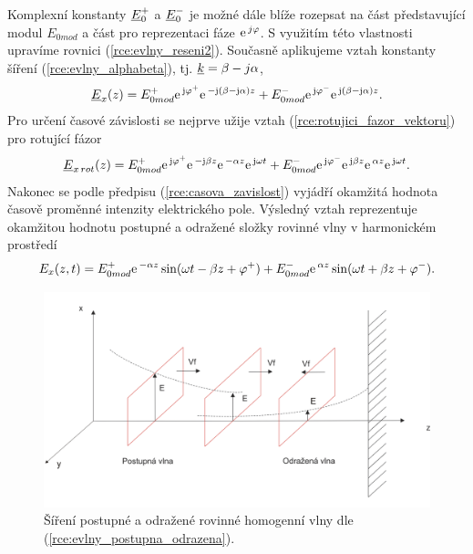 Komplexní konstanty ${\underline{E}}_{0}^{+}$ a ${\underline{E}}_{0}^{-}$ je možné dále blíže rozepsat na část představující modul $E_{0mod}$ a část pro reprezentaci fáze $\mathrm{e\,}^{j\varphi}$. S využitím této vlastnosti upravíme rovnici (\ref{rce:evlny_reseni2}). Současně aplikujeme vztah konstanty šíření (\ref{rce:evlny_alphabeta}), tj. ${\underline{k}} = \beta - j\alpha$,
\begin{displaymath}
	{\underline{E}}_{x}(z) = E_{0mod}^{+}\mathrm{e\,}^{\mathrm{j}\varphi^{+}}\mathrm{e\,}^{-\mathrm{j}(\beta - \mathrm{j}\alpha)z} + E_{0mod}^{-}\mathrm{e\,}^{\mathrm{j}\varphi^{-}}\mathrm{e\,}^{\mathrm{j}(\beta-\mathrm{j}\alpha)z}.
\end{displaymath}
Pro určení časové závislosti se nejprve užije vztah (\ref{rce:rotujici_fazor_vektoru}) pro rotující fázor
\begin{displaymath}
	{\underline{E}}_{x\,rot}(z) = E_{0mod}^{+}\mathrm{e\,}^{\mathrm{j}\varphi^{+}}\mathrm{e\,}^{-\mathrm{j}\beta z}\mathrm{e\,}^{-\alpha z}\mathrm{e\,}^{\mathrm{j}\omega t} + E_{0mod}^{-}\mathrm{e\,}^{\mathrm{j}\varphi^{-}}\mathrm{e\,}^{\mathrm{j}\beta z}\mathrm{e\,}^{\alpha z}\mathrm{e\,}^{\mathrm{j}\omega t}.
\end{displaymath}
Nakonec se podle předpisu (\ref{rce:casova_zavislost}) vyjádří okamžitá hodnota časově proměnné intenzity elektrického pole. Výsledný vztah reprezentuje okamžitou hodnotu postupné a odražené složky rovinné vlny v harmonickém prostředí
\begin{equation}
	E_{x}(z,t) = E_{0mod}^{+}\mathrm{e\,}^{-\alpha z}\sin(\omega t - \beta z + \varphi^{+}) + E_{0mod}^{-}\mathrm{e\,}^{\alpha z}\sin(\omega t + \beta z + \varphi^{-}).
	\label{rce:evlny_postupna_odrazena}
\end{equation}

\begin{figure}[!h]
	\centering
	\includegraphics[width=14cm]{evlny_postupna_odrazena.png}
	\caption{Šíření postupné a odražené rovinné homogenní vlny dle (\ref{rce:evlny_postupna_odrazena}).}
	\label{obr:evlny_postupna_odrazena}
\end{figure}
